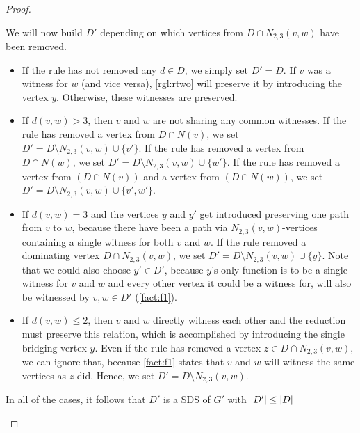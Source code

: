 \begin{proof}
\begin{enumerate}
            We will now build $D'$ depending on which vertices from $D \cap N_{2,3}(v,w)$ have been removed. 
            \begin{itemize}
                \item If the rule has not removed any $d \in D$, we simply set $D' = D$. If $v$ was a witness for $w$ (and vice versa), \cref{rgl:rtwo} will preserve it by introducing the vertex $y$. Otherwise, these witnesses are preserved.
                \item If $d(v,w) > 3$, then $v$ and $w$ are not sharing any common witnesses. 
                If the rule has removed a vertex from $D \cap N(v)$, we set $D' = D \setminus N_{2,3}(v,w) \cup \{v'\}$.
                If the rule has removed a vertex from $D \cap N(w)$, we  set $D' = D \setminus N_{2,3}(v,w) \cup \{w'\}$.
                If the rule has removed a vertex from $(D \cap N(v))$ and a vertex from $(D \cap N(w))$, we set $D' = D \setminus N_{2,3}(v,w) \cup \{v', w'\}$.
                \item If $d(v,w) = 3$ and the vertices $y$ and $y'$ get introduced preserving one path from $v$ to $w$, because there have been a path via $N_{2,3}(v,w)$-vertices containing a single witness for both $v$ and $w$.
                If the rule removed a dominating vertex $D \cap N_{2,3}(v, w)$, we set $D' = D \setminus N_{2,3}(v,w) \cup \{y\}$. Note that we could also choose $y' \in D'$, because $y$'s only function is to be a single witness for $v$ and $w$ and every other vertex it could be a witness for, will also be witnessed by $v,w \in D'$ (\cref{fact:f1}).
                \item If $d(v,w) \leq 2$, then $v$ and $w$ directly witness each other and the reduction must preserve this relation, which is accomplished by introducing the single bridging vertex $y$. 
                Even if the rule has removed a vertex $z \in D \cap N_{2,3}(v,w)$, we can ignore that, because \cref{fact:f1} states that $v$ and $w$ will witness the same vertices as $z$ did. Hence, we set $D' = D \setminus N_{2,3}(v,w)$.
            \end{itemize}
            
            In all of the cases, it follows that $D'$ is a SDS of $G'$ with $\abs{D'} \leq \abs{D}$ 
            

\end{enumerate}
\end{proof}
